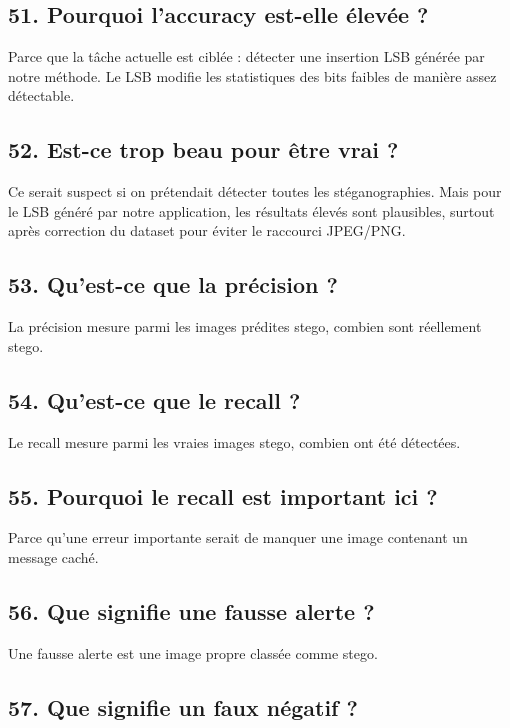 \documentclass[11pt,a4paper]{article}
\begin{document}
\subsection{51. Pourquoi l'accuracy est-elle élevée ?}

Parce que la tâche actuelle est ciblée : détecter une insertion LSB générée par notre méthode. Le LSB modifie les statistiques des bits faibles de manière assez détectable.

\subsection{52. Est-ce trop beau pour être vrai ?}

Ce serait suspect si on prétendait détecter toutes les stéganographies. Mais pour le LSB généré par notre application, les résultats élevés sont plausibles, surtout après correction du dataset pour éviter le raccourci JPEG/PNG.

\subsection{53. Qu'est-ce que la précision ?}

La précision mesure parmi les images prédites stego, combien sont réellement stego.

\subsection{54. Qu'est-ce que le recall ?}

Le recall mesure parmi les vraies images stego, combien ont été détectées.

\subsection{55. Pourquoi le recall est important ici ?}

Parce qu'une erreur importante serait de manquer une image contenant un message caché.

\subsection{56. Que signifie une fausse alerte ?}

Une fausse alerte est une image propre classée comme stego.

\subsection{57. Que signifie un faux négatif ?}
\end{document}
